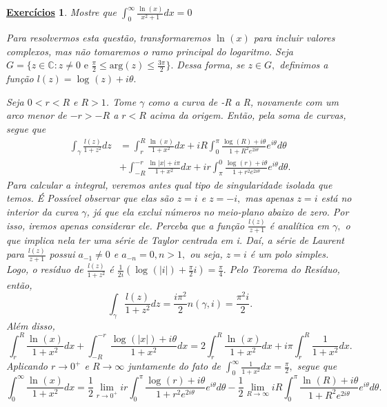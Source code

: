 \documentclass{article}
\newtheorem*{exer*}{\underline{Exerc\'icios}}
\begin{document}
  \begin{exer*}
    Mostre que \(\int_{0}^{\infty}\frac{\ln^{}{(x)}}{x^{2}+1}dx = 0\)

    Para resolvermos esta questão, transformaremos \(\ln^{}{(x)}\) para incluir valores complexos, mas não tomaremos o ramo principal do logaritmo.
    Seja \(G = \{z\in \mathbb{C}: z\neq0\text{ e }\frac{\pi }{2}\leq \mathrm{arg}(z)\leq \frac{3\pi }{2}\}.\) Dessa forma, se \(z\in G,\) definimos a função
    \(l(z) = \log^{}{(z)} + i\theta .\)

    Seja \(0 < r < R\) e \(R > 1\). Tome \(\gamma \) como a curva de -R a R, novamente com um arco menor de \(-r > -R\) a \(r < R\) acima da origem. Então, 
    pela soma de curvas, segue que 
    \begin{align*}
      \int_{\gamma }^{}\frac{l(z)}{1 + z^{2}}dz &= \int_{r}^{R}\frac{\ln^{}{(x)}}{1 + x^{2}}dx + iR \int_{0}^{\pi }\frac{\log^{}{(R)}+i\theta }{1 + R^{2}e^{2i\theta }}e^{i\theta }d\theta \\
                                                &+ \int_{-R}^{-r}\frac{\ln^{}{|x|}+i\pi }{1 + x^{2}}dx + ir \int_{\pi }^{0}\frac{\log^{}{(r)} + i\theta }{1 + r^{2}e^{2i\theta }}e^{i\theta }d\theta.
    \end{align*}
    Para calcular a integral, veremos antes qual tipo de singularidade isolada que temos. É Possível observar que elas são
    \(z=i\) e \(z=-i,\) mas apenas \(z=i\) está no interior da curva \(\gamma \), já que ela exclui números no meio-plano abaixo de zero. Por isso,
    iremos apenas considerar ele. Perceba que a função \(\frac{l(z)}{z+1}\) é analítica em \(\gamma ,\) o que implica nela ter uma série de Taylor
    centrada em i. Daí, a série de Laurent para \(\frac{l(z)}{z+1}\) possui \(a_{-1}\neq0\) e \(a_{-n} = 0, n > 1,\) ou seja,
    \(z=i\) é um polo simples. Logo, o resíduo de \(\frac{l(z)}{1+z^{2}}\) é \(\frac{1}{2i}(\log^{}{(|i|)} + \frac{\pi }{2}i) = \frac{\pi }{4}.\) 
    Pelo Teorema do Resíduo, então, 
    \[
      \int_{\gamma }^{}\frac{l(z)}{1+z^{2}}dz = \frac{i\pi ^{2}}{2}n(\gamma, i) = \frac{\pi^{2}i}{2}.
    \]
    Além disso,
    \[
      \int_{r}^{R}\frac{\ln^{}{(x)}}{1+x^{2}}dx + \int_{-R}^{-r}\frac{\log^{}{(|x|)} + i\theta }{1 + x^{2}}dx = 2 \int_{r}^{R}\frac{\ln^{}{(x)}}{1 + x^{2}}dx + i\pi \int_{r}^{R}\frac{1}{1+x^{2}}dx.
    \]
    Aplicando \(r\to 0^{+}\) e \(R\to \infty\) juntamente do fato de \(\int_{0}^{\infty}\frac{1}{1+x^{2}}dx = \frac{\pi }{2},\) segue que 
    \[
      \int_{0}^{\infty}\frac{\ln^{}{(x)}}{1 + x^{2}}dx = \frac{1}{2}\lim_{r\to 0^{+}}ir \int_{0}^{\pi }\frac{\log^{}{(r)} + i\theta }{1 + r^{2}e^{2i\theta }}e^{i\theta }d\theta - \frac{1}{2}\lim_{R\to \infty}iR \int_{0}^{\pi }\frac{\ln^{}{(R)} + i\theta }{1 + R^{2}e^{2i\theta }}e^{i\theta }d\theta .
\]
\end{exer*}
\end{document}
